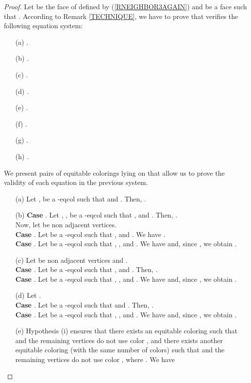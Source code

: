 \begin{proof}
Let  be the face of  defined by (\ref{RNEIGHBOR3AGAIN}) and
 be a face such that .
According to Remark \ref{TECHNIQUE}, we have to prove that  verifies the following equation system: 
\begin{enumerate}
\item[(a)] .
\item[(b)] .
\item[(c)] .
\item[(d)] .
\item[(e)] .
\item[(f)] .
\item[(g)] .
\item[(h)] .
\end{enumerate}
We present pairs of equitable colorings lying on  that allow us to
prove the validity of each equation in the previous system.
\begin{enumerate}
\item[(a)] Let ,  be a -eqcol such that  and .
Then, .
\item[(b)] \textbf{Case }. Let , ,  be a -eqcol
such that ,  and . Then, .\\
Now, let  be non adjacent vertices.\\
\textbf{Case }. Let  be a -eqcol such that ,
 and . We have .\\
\textbf{Case }. Let  be a -eqcol such that , ,  and .
We have  and, since
, we obtain .
\item[(c)] Let  be non adjacent vertices and .\\
\textbf{Case }. Let  be a -eqcol such that ,
 and . Then, .\\
\textbf{Case }. Let  be a -eqcol such that , ,  and
. We have  and,
since , we obtain
.
\item[(d)] Let .\\
\textbf{Case }. Let  be a -eqcol such that  and
. Then, .\\
\textbf{Case }. Let  be a -eqcol such that , ,  and .
We have  and, since , we obtain .
\item[(e)] Hypothesis (i) ensures that there exists an equitable coloring  such that
 and the remaining vertices do not use color , and there exists
another equitable coloring  (with the same number of colors) such that 
and the remaining vertices do not use color , where . We have


\end{enumerate}
\end{proof}
